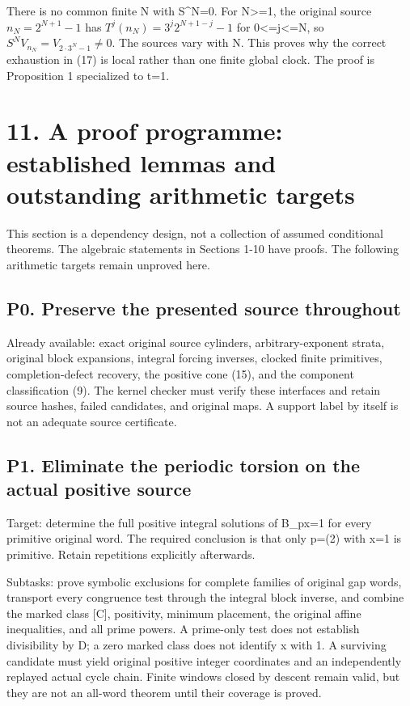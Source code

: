 There is no common finite N with S\^{}N=0. For N\textgreater=1, the
original source \(n_N=2^{N+1}-1\) has \(T^j(n_N)=3^j2^{N+1-j}-1\) for
0\textless=j\textless=N, so \(S^NV_{n_N}=V_{2\cdot3^N-1}\ne0\). The
sources vary with N. This proves why the correct exhaustion in (17) is
local rather than one finite global clock. The proof is Proposition 1
specialized to t=1.

\section{11. A proof programme: established lemmas and outstanding
arithmetic targets}

This section is a dependency design, not a collection of assumed
conditional theorems. The algebraic statements in Sections 1-10 have
proofs. The following arithmetic targets remain unproved here.

\subsection{P0. Preserve the presented source throughout}

Already available: exact original source cylinders, arbitrary-exponent
strata, original block expansions, integral forcing inverses, clocked
finite primitives, completion-defect recovery, the positive cone (15),
and the component classification (9). The kernel checker must verify
these interfaces and retain source hashes, failed candidates, and
original maps. A support label by itself is not an adequate source
certificate.

\subsection{P1. Eliminate the periodic torsion on the actual positive
source}

Target: determine the full positive integral solutions of B\_px=1 for
every primitive original word. The required conclusion is that only
p=(2) with x=1 is primitive. Retain repetitions explicitly afterwards.

Subtasks: prove symbolic exclusions for complete families of original
gap words, transport every congruence test through the integral block
inverse, and combine the marked class {[}C{]}, positivity, minimum
placement, the original affine inequalities, and all prime powers. A
prime-only test does not establish divisibility by D; a zero marked
class does not identify x with 1. A surviving candidate must yield
original positive integer coordinates and an independently replayed
actual cycle chain. Finite windows closed by descent remain valid, but
they are not an all-word theorem until their coverage is proved.

